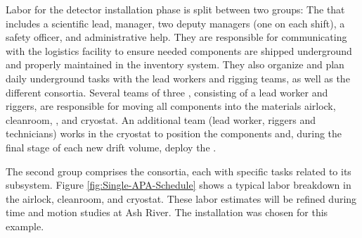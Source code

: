 Labor for the detector installation phase is split between two groups: The  that includes a scientific lead, manager, two deputy managers (one on each shift), a safety officer, and administrative help. They are responsible for communicating with the logistics facility to ensure needed components are shipped underground and properly maintained in the inventory system.  They also organize and plan daily underground tasks with the lead workers and rigging teams, as well as the different consortia.  Several teams of three , consisting of a lead worker and riggers, are responsible for moving all  components into the materials airlock,  cleanroom, \coldbox, and cryostat. An additional team (lead worker, riggers and technicians) works in the cryostat to position the  components and, during the final stage of each new drift volume,  deploy the . 

The second group comprises the  consortia, each with specific tasks related to its subsystem. Figure \ref{fig:Single-APA-Schedule} shows a typical labor breakdown in the airlock,  cleanroom, and cryostat. These labor estimates will be refined during time and motion studies at Ash River. The  installation was chosen for this example.  

